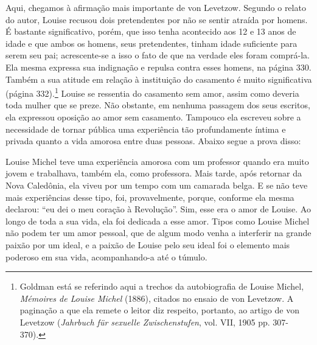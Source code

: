 Aqui, chegamos à afirmação mais importante de von Levetzow. Segundo o
relato do autor, Louise recusou dois pretendentes por não se sentir
atraída por homens. É bastante significativo, porém, que isso tenha
acontecido aos 12 e 13 anos de idade e que ambos os homens, seus
pretendentes, tinham idade suficiente para serem seu pai; acrescente-se
a isso o fato de que na verdade eles foram comprá-la. Ela mesma expressa
sua indignação e repulsa contra esses homens, na página 330. Também a
sua atitude em relação à instituição do casamento é muito significativa
(página 332).\footnote{Goldman está se referindo aqui a trechos da
  autobiografia de Louise Michel, \emph{Mémoires de Louise Michel}
  (1886), citados no ensaio de von Levetzow. A paginação a que ela
  remete o leitor diz respeito, portanto, ao artigo de von Levetzow
  (\emph{Jahrbuch für sexuelle Zwischenstufen}, vol. VII, 1905 pp.
  307-370).} Louise se ressentia do casamento sem amor, assim como
deveria toda mulher que se preze. Não obstante, em nenhuma passagem dos
seus escritos, ela expressou oposição ao amor sem casamento. Tampouco
ela escreveu sobre a necessidade de tornar pública uma experiência tão
profundamente íntima e privada quanto a vida amorosa entre duas pessoas.
Abaixo segue a prova disso:

Louise Michel teve uma experiência amorosa com um professor quando era
muito jovem e trabalhava, também ela, como professora. Mais tarde, após
retornar da Nova Caledônia, ela viveu por um tempo com um camarada
belga. E se não teve mais experiências desse tipo, foi, provavelmente,
porque, conforme ela mesma declarou: ``eu dei o meu coração à
Revolução''. Sim, esse era o amor de Louise. Ao longo de toda a sua
vida, ela foi dedicada a esse amor. Tipos como Louise Michel não podem
ter um amor pessoal, que de algum modo venha a interferir na grande
paixão por um ideal, e a paixão de Louise pelo seu ideal foi o elemento
mais poderoso em sua vida, acompanhando-a até o túmulo.

